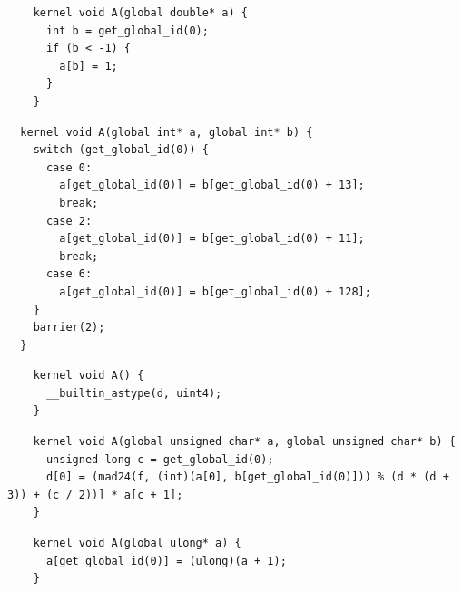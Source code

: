 \newsavebox{\IntelSizetIntReduced}
\begin{lrbox}{\IntelSizetIntReduced}
  \hspace{1.5em}
  \begin{lstlisting}
    kernel void A(global double* a) {
      int b = get_global_id(0);
      if (b < -1) {
        a[b] = 1;
      }
    }
  \end{lstlisting}
\end{lrbox}

\newsavebox{\OclgrindRaceSwitch}
\begin{lrbox}{\OclgrindRaceSwitch}
  \hspace{1.5em}
  \begin{lstlisting}
  kernel void A(global int* a, global int* b) {
    switch (get_global_id(0)) {
      case 0:
        a[get_global_id(0)] = b[get_global_id(0) + 13];
        break;
      case 2:
        a[get_global_id(0)] = b[get_global_id(0) + 11];
        break;
      case 6:
        a[get_global_id(0)] = b[get_global_id(0) + 128];
    }
    barrier(2);
  }
  \end{lstlisting}
\end{lrbox}

\newsavebox{\AlmostEverythingCrash}
\begin{lrbox}{\AlmostEverythingCrash}
  \hspace{1.5em}
  \begin{lstlisting}
    kernel void A() {
      __builtin_astype(d, uint4);
    }
  \end{lstlisting}
\end{lrbox}

\newsavebox{\OclgrindSemaAssertion}
\begin{lrbox}{\OclgrindSemaAssertion}
  \hspace{1.5em}
  \begin{lstlisting}
    kernel void A(global unsigned char* a, global unsigned char* b) {
      unsigned long c = get_global_id(0);
      d[0] = (mad24(f, (int)(a[0], b[get_global_id(0)])) % (d * (d + 3)) + (c / 2))] * a[c + 1];
    }
  \end{lstlisting}
\end{lrbox}

\newsavebox{\IntelPtrCompilerHang}
\begin{lrbox}{\IntelPtrCompilerHang}
  \hspace{1.5em}
  \begin{lstlisting}
    kernel void A(global ulong* a) {
      a[get_global_id(0)] = (ulong)(a + 1);
    }
  \end{lstlisting}
\end{lrbox}

